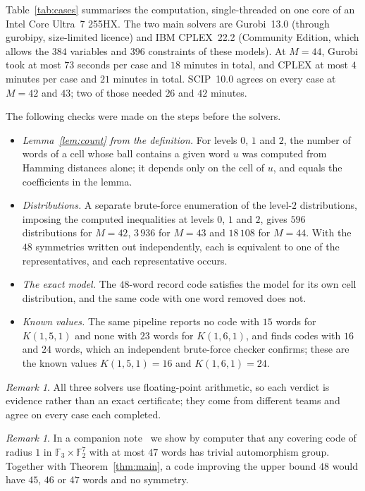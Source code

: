\documentclass[11pt]{article}
\theoremstyle{remark}
\newtheorem{remark}[theorem]{Remark}
\newcommand{\F}{\mathbb{F}}
\begin{document}
Table~\ref{tab:cases} summarises the computation, single-threaded on one core of an Intel Core
Ultra~7 255HX. The two main solvers are Gurobi~13.0 (through gurobipy, size-limited licence) and
IBM CPLEX~22.2 (Community Edition, which allows the $384$ variables and $396$ constraints of these
models). At $M=44$, Gurobi took at most $73$ seconds per case and $18$ minutes in total, and CPLEX
at most $4$ minutes per case and $21$ minutes in total. SCIP~10.0 agrees on every case at $M=42$
and $43$; two of those needed $26$ and $42$ minutes.

The following checks were made on the steps before the solvers.
\begin{itemize}
\item \emph{Lemma~\ref{lem:count} from the definition.} For levels $0$, $1$ and $2$, the number
  of words of a cell whose ball contains a given word $u$ was computed from Hamming distances
  alone; it depends only on the cell of $u$, and equals the coefficients in the lemma.
\item \emph{Distributions.} A separate brute-force enumeration of the level-$2$ distributions,
  imposing the computed inequalities at levels $0$, $1$ and $2$, gives $596$ distributions for
  $M=42$, $3\,936$ for $M=43$ and $18\,108$ for $M=44$. With the $48$ symmetries written out independently, each is
  equivalent to one of the representatives, and each representative occurs.
\item \emph{The exact model.} The $48$-word record code satisfies the model for its own cell
  distribution, and the same code with one word removed does not.
\item \emph{Known values.} The same pipeline reports no code with $15$ words for $K(1,5,1)$ and
  none with $23$ words for $K(1,6,1)$, and finds codes with $16$ and $24$ words, which an
  independent brute-force checker confirms; these are the known values $K(1,5,1)=16$ and
  $K(1,6,1)=24$.
\end{itemize}

\begin{remark}
All three solvers use floating-point arithmetic, so each verdict is evidence rather than an exact
certificate; they come from different teams and agree on every case each completed.
\end{remark}

\begin{remark}
In a companion note~\cite{companion} we show by computer that any covering code of radius $1$ in
$\F_3\times\F_2^7$ with at most $47$ words has trivial automorphism group. Together with
Theorem~\ref{thm:main}, a code improving the upper bound $48$ would have $45$, $46$ or $47$ words
and no symmetry.
\end{remark}
\end{document}
